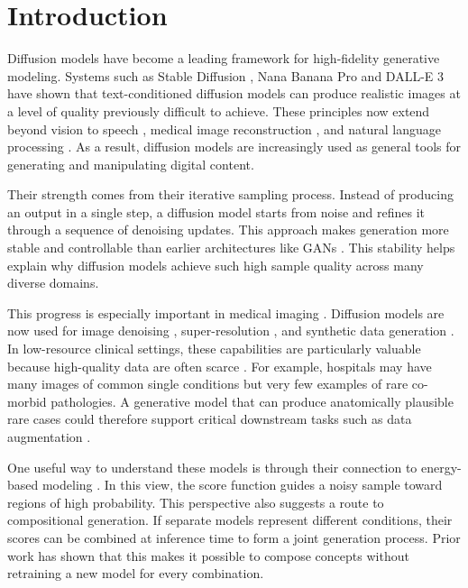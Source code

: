 
\chapter{Introduction}
\label{chap:introduction}

Diffusion models \citep{song2021train,NEURIPS2020_4c5bcfec} have become a leading framework for high-fidelity generative modeling.
Systems such as Stable Diffusion \citep{rombach2022high}, Nana Banana Pro and DALL-E 3 \citep{BetkerImprovingIG} have shown that text-conditioned diffusion models can produce realistic images at a level of quality previously difficult to achieve. 
These principles now extend beyond vision\citep{rombach2022high} to speech \citep{chen2020wavegrad}, medical image reconstruction \citep{metal_inpainting_cbct_projections, high_frequency_space_diffusion_model}, and natural language processing \citep{structured_denoising,diffusion_lm, argmax_flows}. 
As a result, diffusion models are increasingly used as general tools for generating and manipulating digital content.

Their strength comes from their iterative sampling process. 
Instead of producing an output in a single step, a diffusion model starts from noise and refines it through a sequence of denoising updates. 
This approach makes generation more stable and controllable than earlier architectures like GANs \citep{NIPS2014_f033ed80}. 
This stability helps explain why diffusion models achieve such high sample quality across many diverse domains.

This progress is especially important in medical imaging \citep{metal_inpainting_cbct_projections, high_frequency_space_diffusion_model}. 
Diffusion models are now used for image denoising \citep{NEURIPS2020_4c5bcfec}, super-resolution \citep{superresolution_via_iterative_refinement}, and synthetic data generation \citep{rombach2022high}. 
In low-resource clinical settings, these capabilities are particularly valuable because high-quality data are often scarce \citep{GROGER2025100220, Nyamawe2026OnTU}. 
For example, hospitals may have many images of common single conditions but very few examples of rare co-morbid pathologies.
A generative model that can produce anatomically plausible rare cases could therefore support critical downstream tasks such as data augmentation \citep{HOLSTE2024103224}.

One useful way to understand these models is through their connection to energy-based modeling \citep{LeCun2006ATO}. 
In this view, the score function guides a noisy sample toward regions of high probability. 
This perspective also suggests a route to compositional generation. 
If separate models represent different conditions, their scores can be combined at inference time to form a joint generation process. 
Prior work \citep{du2023reduce,du2024compositional,skreta2024superposition, NEURIPS2020_49856ed4} has shown that this makes it possible to compose concepts without retraining a new model for every combination.

